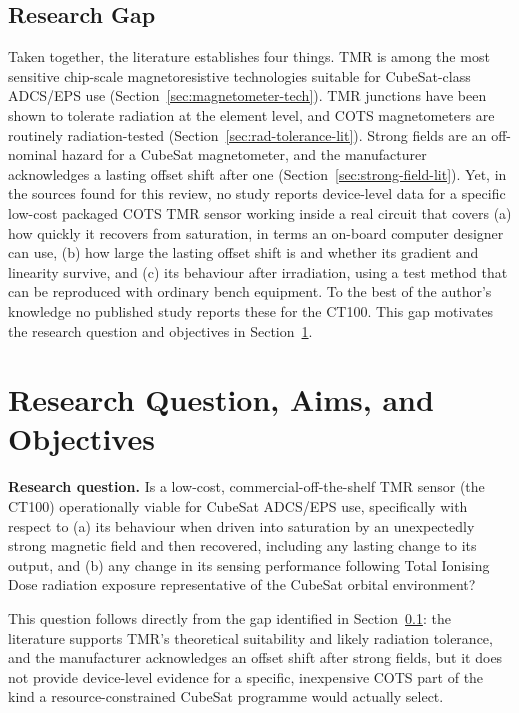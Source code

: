 \documentclass[12pt,a4paper]{article}
\begin{document}
\subsection{Research Gap}
\label{sec:gap}

Taken together, the literature establishes four things. TMR is among the most sensitive chip-scale magnetoresistive technologies suitable for CubeSat-class ADCS/EPS use (Section~\ref{sec:magnetometer-tech}). TMR junctions have been shown to tolerate radiation at the element level, and COTS magnetometers are routinely radiation-tested (Section~\ref{sec:rad-tolerance-lit}). Strong fields are an off-nominal hazard for a CubeSat magnetometer, and the manufacturer acknowledges a lasting offset shift after one (Section~\ref{sec:strong-field-lit}). Yet, in the sources found for this review, no study reports device-level data for a specific low-cost packaged COTS TMR sensor working inside a real circuit that covers (a) how quickly it recovers from saturation, in terms an on-board computer designer can use, (b) how large the lasting offset shift is and whether its gradient and linearity survive, and (c) its behaviour after irradiation, using a test method that can be reproduced with ordinary bench equipment. To the best of the author's knowledge no published study reports these for the CT100. This gap motivates the research question and objectives in Section~\ref{sec:research-question}.

\section{Research Question, Aims, and Objectives}
\label{sec:research-question}

\textbf{Research question.} Is a low-cost, commercial-off-the-shelf TMR sensor (the CT100) operationally viable for CubeSat ADCS/EPS use, specifically with respect to (a) its behaviour when driven into saturation by an unexpectedly strong magnetic field and then recovered, including any lasting change to its output, and (b) any change in its sensing performance following Total Ionising Dose radiation exposure representative of the CubeSat orbital environment?

This question follows directly from the gap identified in Section~\ref{sec:gap}: the literature supports TMR's theoretical suitability and likely radiation tolerance, and the manufacturer acknowledges an offset shift after strong fields, but it does not provide device-level evidence for a specific, inexpensive COTS part of the kind a resource-constrained CubeSat programme would actually select.
\end{document}
